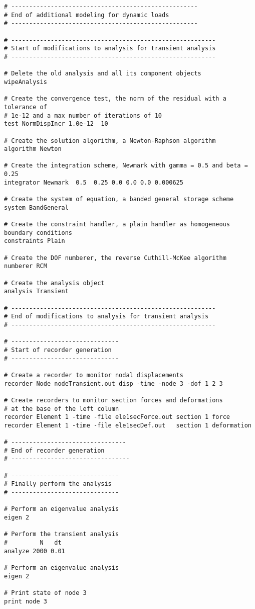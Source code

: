 \documentclass[12pt]{article}
\begin{document}
{\begin{verbatim}
# ----------------------------------------------------
# End of additional modeling for dynamic loads
# ----------------------------------------------------

# ---------------------------------------------------------
# Start of modifications to analysis for transient analysis
# ---------------------------------------------------------

# Delete the old analysis and all its component objects
wipeAnalysis

# Create the convergence test, the norm of the residual with a tolerance of 
# 1e-12 and a max number of iterations of 10
test NormDispIncr 1.0e-12  10 

# Create the solution algorithm, a Newton-Raphson algorithm
algorithm Newton

# Create the integration scheme, Newmark with gamma = 0.5 and beta =  0.25
integrator Newmark  0.5  0.25 0.0 0.0 0.0 0.000625

# Create the system of equation, a banded general storage scheme
system BandGeneral

# Create the constraint handler, a plain handler as homogeneous boundary conditions
constraints Plain

# Create the DOF numberer, the reverse Cuthill-McKee algorithm
numberer RCM

# Create the analysis object
analysis Transient

# ---------------------------------------------------------
# End of modifications to analysis for transient analysis
# ---------------------------------------------------------

# ------------------------------
# Start of recorder generation
# ------------------------------

# Create a recorder to monitor nodal displacements
recorder Node nodeTransient.out disp -time -node 3 -dof 1 2 3

# Create recorders to monitor section forces and deformations
# at the base of the left column
recorder Element 1 -time -file ele1secForce.out section 1 force
recorder Element 1 -time -file ele1secDef.out   section 1 deformation

# --------------------------------
# End of recorder generation
# ---------------------------------

# ------------------------------
# Finally perform the analysis
# ------------------------------

# Perform an eigenvalue analysis
eigen 2

# Perform the transient analysis
#         N   dt
analyze 2000 0.01

# Perform an eigenvalue analysis
eigen 2

# Print state of node 3
print node 3
\end{verbatim}
}
\end{document}

